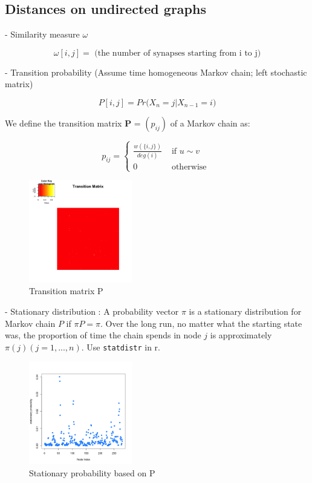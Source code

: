 \documentclass[12pt]{report}
\begin{document}
\subsection{Distances on undirected graphs}

- Similarity measure $\omega$

$$\omega[i,j] = \mbox{ (the number of synapses starting from i to j)}$$
 

- Transition probability (Assume time homogeneous Markov chain; left stochastic matrix)

$$P[i,j] = Pr\big( X_{n} = j  | X_{n-1} = i \big)$$

We define the transition matrix \textbf{P} = $(p_{ij})$ of a Markov chain as:

$$p_{ij} = \left\{ \begin{array}{ll} \frac{w(\{ i, j\})}{ deg(i) } & \mbox{ if } u \sim v \\ 0 & \mbox{ otherwise }  \end{array}  \right.$$


\begin{figure}[H]
\captionsetup{format=plain}
\centering
\includegraphics[width=0.4\textwidth]{../figure/trans.png}
\caption{Transition matrix P}
\label{fig:trans}
\end{figure}




- Stationary distribution 
: A probability vector $\pi$ is a stationary distribution for Markov chain $P$ if $\pi P = \pi$. Over the long run, no matter what the starting state was, the proportion of time the chain spends in node $j$ is approximately $\pi(j) (j = 1, ... , n)$.
Use \verb!statdistr! in r.

\begin{figure}[H]
\captionsetup{format=plain}
\centering
\includegraphics[width=0.4\textwidth]{../figure/statd.png}
\caption{Stationary probability based on P}
\label{fig:statd}
\end{figure}
\end{document}
